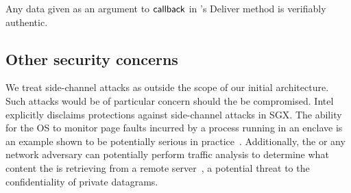 \begin{lemma} \label{lem:authentic-delivery}
Any data given as an argument to ${\sf callback}$ in \tcont's Deliver method is verifiably authentic.
\end{lemma}


\subsection{Other security concerns}
We treat side-channel attacks as outside the scope of our initial \tc architecture. Such attacks would be of particular concern should the \medname be compromised. Intel explicitly disclaims protections against side-channel attacks in SGX. The ability for the OS to monitor page faults incurred by a process running in an enclave is an example shown to be potentially serious in practice~\cite{}. Additionally, the \medname or any network adversary can potentially perform traffic analysis to determine what content the \encname is retrieving from a remote server~\cite{}, a potential threat to the confidentiality of private datagrams.


